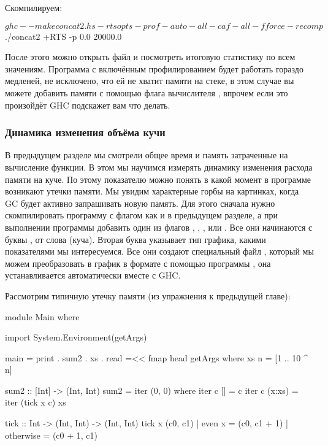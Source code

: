 Скомпилируем:

\begin{code}
$ ghc --make concat2.hs -rtsopts -prof -auto-all -caf-all -fforce-recomp
$ ./concat2 +RTS -p
0.0
20000.0
\end{code}
  
После этого можно открыть файл  и посмотреть 
итоговую статистику по всем значениям. Программа с включённым
профилированием будет работать гораздо медленей, не исключено,
что ей не хватит памяти на стеке, в этом случае вы можете добавить
памяти с помощью флага вычислителя , впрочем если это произойдёт
GHC подскажет вам что делать. 

\subsubsection{Динамика изменения объёма кучи}

В предыдущем разделе мы смотрели общее время и память
затраченные на вычисление функции. В этом мы научимся
измерять динамику изменения расхода памяти на куче. 
По этому показателю можно понять в какой момент 
в программе возникают утечки памяти. Мы увидим характерные
горбы на картинках, когда GC будет активно запрашивать новую память.
Для этого сначала нужно скомпилировать программу с флагом 
как и в предыдущем разделе, а при выполнении программы 
добавить один из флагов , , ,  или .
Все они начинаются с буквы , от слова  (куча). 
Вторая буква указывает тип графика, какими показателями
мы интересуемся. Все они создают специальный файл 
, который мы можем преобразовать в
график в формате  с помощью программы
, она устанавливается автоматически вместе с GHC.

Рассмотрим типичную утечку памяти (из упражнения к предыдущей главе):


\begin{code}
module Main where

import System.Environment(getArgs)

main = print . sum2 . xs . read =<< fmap head getArgs  
    where xs n = [1 .. 10 ^ n]

sum2 :: [Int] -> (Int, Int)
sum2 = iter (0, 0)
    where iter c  []     = c
          iter c  (x:xs) = iter (tick x c) xs

tick :: Int -> (Int, Int) -> (Int, Int)
tick x (c0, c1) | even x    = (c0, c1 + 1)
                | otherwise = (c0 + 1, c1)
\end{code}

